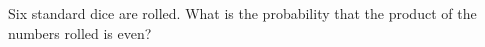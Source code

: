 Six standard dice are rolled. What is the probability that the product of the numbers rolled is even?
